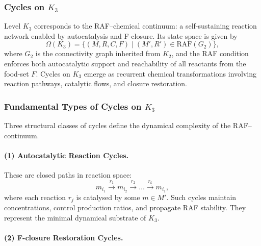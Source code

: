 
\subsubsection{Cycles on \texorpdfstring{$K_3$}{K_3}}
\label{sec:cycles-k3}

Level $K_3$ corresponds to the RAF–chemical continuum:
a self-sustaining reaction network enabled by autocatalysis and
F-closure.
Its state space is given by
\[
  \Omega(K_3) = \{(M,R,C,F)\mid (M',R')\in \mathrm{RAF}(G_2)\},
\]
where $G_2$ is the connectivity graph inherited from $K_2$,
and the RAF condition enforces both autocatalytic support and reachability
of all reactants from the food-set $F$.
Cycles on $K_3$ emerge as recurrent chemical transformations involving
reaction pathways, catalytic flows, and closure restoration.

\subsubsection{Fundamental Types of Cycles on \texorpdfstring{$K_3$}{K_3}}

Three structural classes of cycles define the dynamical complexity of
the RAF–continuum.

\paragraph{(1) Autocatalytic Reaction Cycles.}

These are closed paths in reaction space:
\[
  m_{i_1}\xrightarrow{r_1} m_{i_2}
    \xrightarrow{r_2} \dots
    \xrightarrow{r_k} m_{i_1},
\]
where each reaction $r_j$ is catalysed by some $m\in M'$.
Such cycles maintain concentrations, control production ratios, and
propagate RAF stability.
They represent the minimal dynamical substrate of $K_3$.

\paragraph{(2) F-closure Restoration Cycles.}

